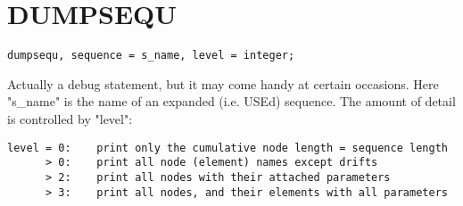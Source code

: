 \section{DUMPSEQU}
\label{sec:dumpsequ}
\begin{verbatim}
dumpsequ, sequence = s_name, level = integer;
\end{verbatim} 
Actually a debug statement, but it may come handy at certain
occasions. Here "s\_name" is the name of an expanded (i.e. USEd)
sequence. The amount of detail is controlled by "level":  
\begin{verbatim}
level = 0:    print only the cumulative node length = sequence length
      > 0:    print all node (element) names except drifts
      > 2:    print all nodes with their attached parameters
      > 3:    print all nodes, and their elements with all parameters
\end{verbatim}



